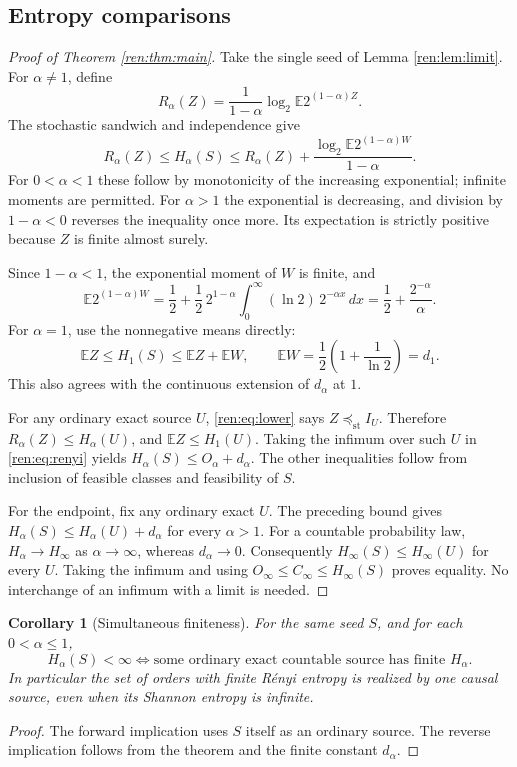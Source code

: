 \documentclass[11pt,a4paper]{article}
\newtheorem{corollary}[theorem]{Corollary}
\theoremstyle{definition}\newtheorem{definition}[theorem]{Definition}
\theoremstyle{remark}\newtheorem{remark}[theorem]{Remark}
\newcommand{\E}{\mathbb E}
\newcommand{\st}{\preceq_{\mathrm{st}}}
\numberwithin{equation}{section}
\begin{document}
\subsection{Entropy comparisons}
\begin{proof}[Proof of Theorem \ref{ren:thm:main}]
Take the single seed of Lemma \ref{ren:lem:limit}. For $\alpha\ne1$, define
\[
 R_\alpha(Z)=\frac{1}{1-\alpha}\log_2\E 2^{(1-\alpha)Z}.
\]
The stochastic sandwich and independence give
\begin{equation}\label{ren:eq:renyi}
 R_\alpha(Z)\le H_\alpha(S)\le
 R_\alpha(Z)+\frac{\log_2\E2^{(1-\alpha)W}}{1-\alpha}.
\end{equation}
For $0<\alpha<1$ these follow by monotonicity of the increasing exponential;
infinite moments are permitted. For $\alpha>1$ the exponential is decreasing,
and division by $1-\alpha<0$ reverses the inequality once more. Its
expectation is strictly positive because $Z$ is finite almost surely.

Since $1-\alpha<1$, the exponential moment of $W$ is finite, and
\[
 \E2^{(1-\alpha)W}
 =\frac12+\frac12\,2^{1-\alpha}
   \int_0^\infty(\ln2)\,2^{-\alpha x}\,dx
 =\frac12+\frac{2^{-\alpha}}{\alpha}.
\]
For $\alpha=1$, use the nonnegative means directly:
\[
 \E Z\le H_1(S)\le \E Z+\E W,\qquad
 \E W=\frac12\left(1+\frac1{\ln2}\right)=d_1.
\]
This also agrees with the continuous extension of $d_\alpha$ at $1$.

For any ordinary exact source $U$, \eqref{ren:eq:lower} says $Z\st I_U$.
Therefore $R_\alpha(Z)\le H_\alpha(U)$, and $\E Z\le H_1(U)$.
Taking the infimum over such $U$ in \eqref{ren:eq:renyi} yields
$H_\alpha(S)\le O_\alpha+d_\alpha$. The other inequalities follow from
inclusion of feasible classes and feasibility of $S$.

For the endpoint, fix any ordinary exact $U$. The preceding bound gives
$H_\alpha(S)\le H_\alpha(U)+d_\alpha$ for every $\alpha>1$.
For a countable probability law, $H_\alpha\to H_\infty$ as
$\alpha\to\infty$, whereas $d_\alpha\to0$. Consequently
$H_\infty(S)\le H_\infty(U)$ for every $U$. Taking the infimum and using
$O_\infty\le C_\infty\le H_\infty(S)$ proves equality.
No interchange of an infimum with a limit is needed.
\end{proof}

\begin{corollary}[Simultaneous finiteness]
For the same seed $S$, and for each $0<\alpha\le1$,
\[
 H_\alpha(S)<\infty
 \iff
 \text{some ordinary exact countable source has finite }H_\alpha.
\]
In particular the set of orders with finite R\'enyi entropy is realized
by one causal source, even when its Shannon entropy is infinite.
\end{corollary}
\begin{proof}
The forward implication uses $S$ itself as an ordinary source. The reverse
implication follows from the theorem and the finite constant $d_\alpha$.
\end{proof}
\end{document}
